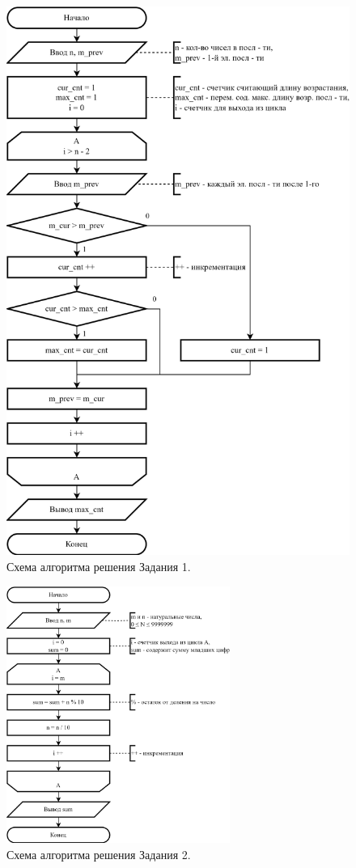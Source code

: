 \documentclass[oneside,a4paper,14pt]{extarticle}
\begin{document}
\begin{figure}
	\centering
	\includegraphics[height=0.9\textheight]{img/1-scheme.png} %
	\caption{Схема алгоритма решения Задания 1.} %
\end{figure}
\begin{figure}
	\centering
	\includegraphics[width=0.65\textwidth]{img/2-scheme.png} %
	\caption{Схема алгоритма решения Задания 2.} %
\end{figure}
\end{document}
